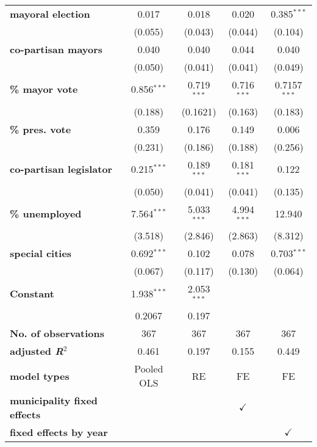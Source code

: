 \begin{table}[!htbp]
{\begin{threeparttable}
\begin{tabular}{lcccc}
\textbf{mayoral election}                & 0.017           & 0.018         & 0.020         & 0.385$^{***}$    \\
                                 &(0.055)          &(0.043)        & (0.044)       &(0.104)           \\
\textbf{co-partisan mayors}                & 0.040           & 0.040         & 0.044         & 0.040            \\
                                 &(0.050)          &(0.041)        & (0.041)       &(0.049)           \\
\textbf{\% mayor vote}                      &0.856$^{***}$    & 0.719$^{***}$ & 0.716$^{***}$ & 0.7157$^{***}$   \\
                                 &(0.188)          & (0.1621)      & (0.163)       &(0.183)           \\
\textbf{\% pres. vote}                       & 0.359           & 0.176         & 0.149         & 0.006            \\
                                 & (0.231)         & (0.186)       & (0.188)       &(0.256)           \\
\textbf{co-partisan legislator}           &0.215$^{***}$    & 0.189$^{***}$ & 0.181$^{***}$ & 0.122            \\
                                 &(0.050)          &(0.041)        &(0.041)        &(0.135)           \\
\textbf{\% unemployed}                    & 7.564$^{***}$   & 5.033$^{***}$ & 4.994$^{***}$ &12.940            \\
                                 & (3.518)         & (2.846)       & (2.863)       &(8.312)           \\
\textbf{special cities}                   & 0.692$^{***}$   & 0.102         & 0.078         & 0.703$^{***}$    \\
                                 & (0.067)         & (0.117)       & (0.130)       &(0.064)           \\
\textbf{Constant}                         & 1.938$^{***}$   & 2.053$^{***}$ &               &                  \\
                                 & 0.2067          & 0.197         &               &                  \\
\midrule 
\textbf{No. of observations}             &367              & 367           & 367           & 367              \\
\textbf{adjusted \textit{R}$^{2}$}                   & 0.461           & 0.197         & 0.155         & 0.449            \\
\textbf{model types}                       & Pooled OLS      & RE            & FE            & FE               \\
\textbf{municipality fixed effects }       &                 &               & $\checkmark$  &                  \\
\textbf{fixed effects by year}               &                 &               &               & $\checkmark$     \\
\midrule


\end{tabular}
\end{threeparttable}}
\end{table}
